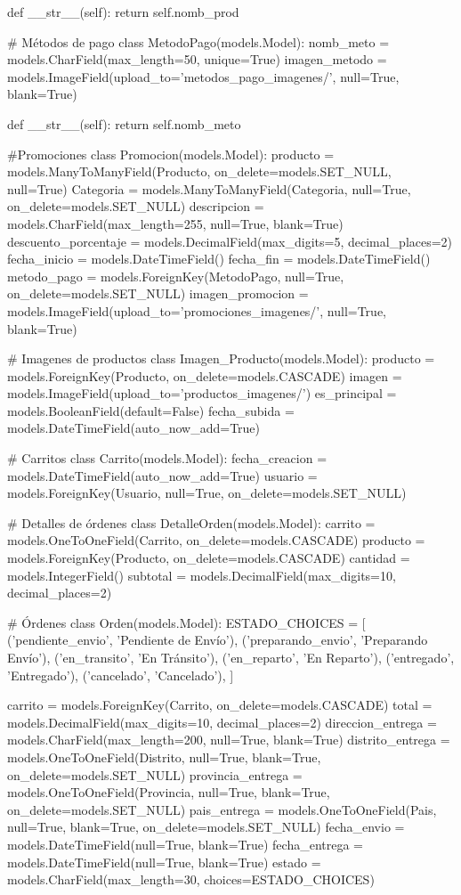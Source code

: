     def __str__(self):
        return self.nomb_prod

# Métodos de pago
class MetodoPago(models.Model):
    nomb_meto = models.CharField(max_length=50, unique=True)
    imagen_metodo = models.ImageField(upload_to='metodos_pago_imagenes/', null=True, blank=True)

    def __str__(self):
        return self.nomb_meto

#Promociones
class Promocion(models.Model):
    producto = models.ManyToManyField(Producto, on_delete=models.SET_NULL, null=True)
    Categoria = models.ManyToManyField(Categoria, null=True, on_delete=models.SET_NULL)
    descripcion = models.CharField(max_length=255, null=True, blank=True)
    descuento_porcentaje = models.DecimalField(max_digits=5, decimal_places=2)
    fecha_inicio = models.DateTimeField()
    fecha_fin = models.DateTimeField()
    metodo_pago = models.ForeignKey(MetodoPago, null=True, on_delete=models.SET_NULL)
    imagen_promocion = models.ImageField(upload_to='promociones_imagenes/', null=True, blank=True)

# Imagenes de productos
class Imagen_Producto(models.Model):
    producto = models.ForeignKey(Producto, on_delete=models.CASCADE)
    imagen = models.ImageField(upload_to='productos_imagenes/')
    es_principal = models.BooleanField(default=False)
    fecha_subida = models.DateTimeField(auto_now_add=True)

# Carritos
class Carrito(models.Model):
    fecha_creacion = models.DateTimeField(auto_now_add=True)
    usuario = models.ForeignKey(Usuario, null=True, on_delete=models.SET_NULL)

# Detalles de órdenes
class DetalleOrden(models.Model):
    carrito = models.OneToOneField(Carrito, on_delete=models.CASCADE)
    producto = models.ForeignKey(Producto, on_delete=models.CASCADE)
    cantidad = models.IntegerField()
    subtotal = models.DecimalField(max_digits=10, decimal_places=2)

# Órdenes
class Orden(models.Model):
    ESTADO_CHOICES = [
        ('pendiente_envio', 'Pendiente de Envío'),
        ('preparando_envio', 'Preparando Envío'),
        ('en_transito', 'En Tránsito'),
        ('en_reparto', 'En Reparto'),
        ('entregado', 'Entregado'),
        ('cancelado', 'Cancelado'),
    ]
    
    carrito = models.ForeignKey(Carrito, on_delete=models.CASCADE)
    total = models.DecimalField(max_digits=10, decimal_places=2)
    direccion_entrega = models.CharField(max_length=200, null=True, blank=True)
    distrito_entrega = models.OneToOneField(Distrito, null=True, blank=True, on_delete=models.SET_NULL)
    provincia_entrega = models.OneToOneField(Provincia, null=True, blank=True, on_delete=models.SET_NULL)
    pais_entrega = models.OneToOneField(Pais, null=True, blank=True, on_delete=models.SET_NULL)
    fecha_envio = models.DateTimeField(null=True, blank=True)
    fecha_entrega = models.DateTimeField(null=True, blank=True)
    estado = models.CharField(max_length=30, choices=ESTADO_CHOICES)

